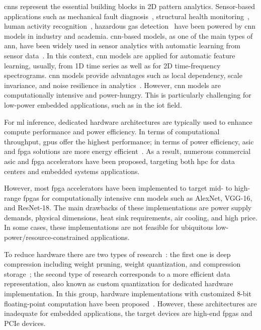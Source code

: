 \glspl{cnn} represent the essential building blocks in 2D pattern analytics. Sensor-based applications such as mechanical fault diagnosis~\cite{li2019sensor,dong2018rolling}, structural health monitoring~\cite{nagayama2007structural}, human activity recognition~\cite{wang2019deep}, hazardous gas detection~\cite{kim2017hazardous} have been powered by \gls{cnn} models in industry and academia. \gls{cnn}-based models, as one of the main types of \gls{ann}, have been widely used in sensor analytics with automatic learning from sensor data~\cite{ince2016real, janssens2016convolutional, abdeljaber2017real, guo2016hierarchical}. In this context, \gls{cnn} models are applied for automatic feature learning, usually, from 1D time series as well as for 2D time-frequency spectrograms. \gls{cnn} models provide advantages such as local dependency, scale invariance, and noise resilience in analytics~\cite{du2014leveraging}. However, \gls{cnn} models are computationally intensive and power-hungry. This is particularly challenging for low-power embedded applications, such as in the \gls{iot} field.

For \gls{ml} inference, dedicated hardware architectures are typically used to enhance compute performance and power efficiency. In terms of computational throughput, \glspl{gpu} offer the highest performance; in terms of power efficiency, \gls{asic} and \gls{fpga} solutions are more energy efficient~\cite{nurvitadhi2017can}. As a result, numerous commercial \gls{asic} and \gls{fpga} accelerators have been proposed, targeting both \gls{hpc} for data centers and embedded systems applications.

However, most \gls{fpga} accelerators have been implemented to target mid- to high-range \glspl{fpga} for computationally intensive \gls{cnn} models such as AlexNet, VGG-16, and ResNet-18. The main drawbacks of these implementations are power supply demands, physical dimensions, heat sink requirements, air cooling, and high price. In some cases, these implementations are not feasible for ubiquitous low-power/resource-constrained applications.

To reduce hardware there are two types of research~\cite{wu2021low}: the first one is deep compression including weight pruning, weight quantization, and compression storage~\cite{han2015deep,han2015learning}; the second type of research corresponds to a more efficient data representation, also known as custom quantization for dedicated hardware implementation. In this group, hardware implementations with customized 8-bit floating-point computation have been proposed~\cite{mei2017200mhz, wu2021low, lian2019high}. However, these architectures are inadequate for embedded applications, the target devices are high-end \glspl{fpga} and PCIe devices.

